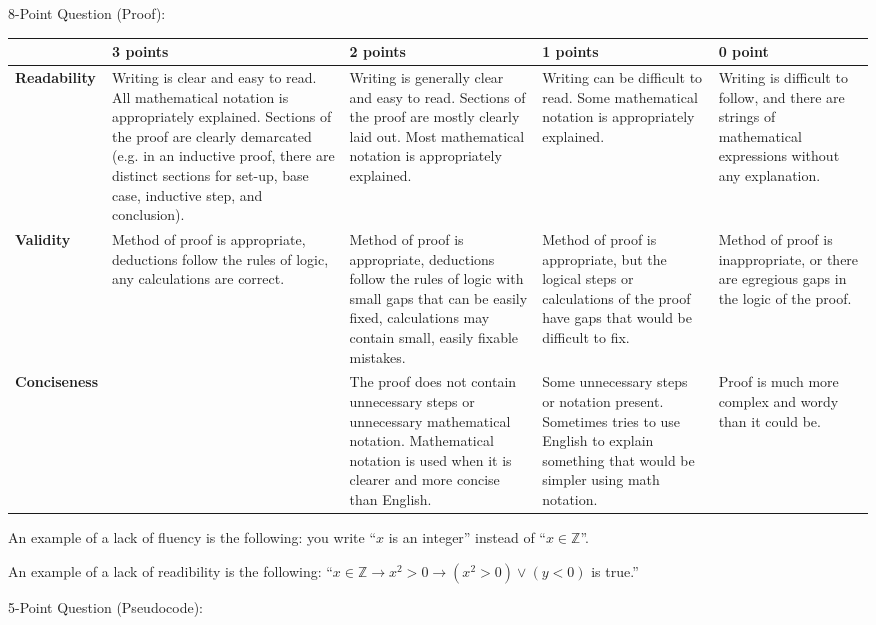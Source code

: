 \documentclass[12pt,landscape]{article}
\begin{document}
{\large 8-Point Question (Proof):}


{\renewcommand{\arraystretch}{2}
\begin{tabular}{|p{2.3cm}|p{4.2cm}|p{4.2cm}|p{4.2cm}|p{4.2cm}|}
\hline
 & {\bf 3 points} & {\bf 2 points} & {\bf 1 points} & {\bf 0 point} \\
\hline
{\bf Readability }& 
 Writing is clear and easy to read. All mathematical notation is appropriately explained. Sections of the proof are clearly demarcated (e.g. in an inductive proof, there are distinct sections for set-up, base case, inductive step, and conclusion). & 
 Writing is generally clear and easy to read. Sections of the proof are mostly clearly laid out. Most mathematical notation is appropriately explained.& 
 Writing can be difficult to read. Some mathematical notation is appropriately explained. & 
 Writing is difficult to follow, and there are strings of mathematical expressions without any explanation.\\
\hline
{\bf Validity }& 
Method of proof is appropriate, deductions follow the rules of logic, any calculations are correct. & 
Method of proof is appropriate, deductions follow the rules of logic with small gaps that can be easily fixed, calculations may contain small, easily fixable mistakes. & 
Method of proof is appropriate, but the logical steps or calculations of the proof have gaps that would be difficult to fix. & 
Method of proof is inappropriate, or there are egregious gaps in the logic of the proof.\\
\hline
{\bf Conciseness} &

&
The proof does not contain unnecessary steps or unnecessary mathematical notation. Mathematical notation is used when it is clearer and more concise than English.
&
Some unnecessary steps or notation present. Sometimes tries to use English to explain something that would be simpler using math notation.
&
Proof is much more complex and wordy than it could be.\\
\hline
 \end{tabular}
}


An example of a lack of fluency is the following: you write ``$x$ is an integer'' instead of ``$x\in \mathbb{Z}$''.

An example of a lack of readibility is the following: ``$x\in\mathbb{Z}\rightarrow x^2>0\rightarrow (x^2>0)\vee(y<0)$ is true.''


\newpage

{\large 5-Point Question (Pseudocode):}
\end{document}
